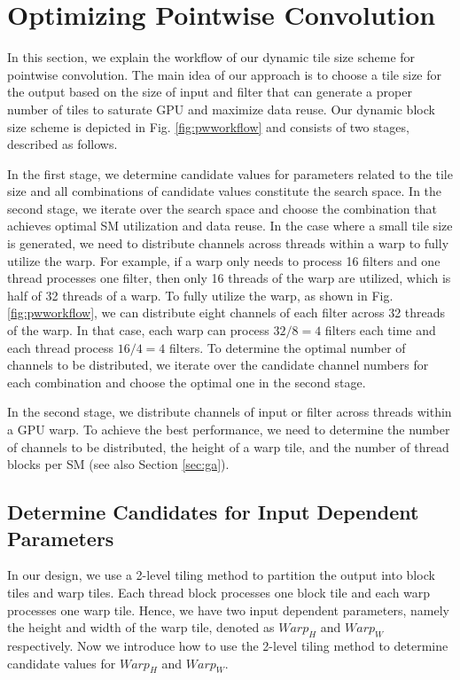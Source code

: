 \section{Optimizing Pointwise Convolution}
\label{sec:pwconv} In this section, we explain the workflow of our dynamic tile size scheme for pointwise convolution.
The main idea of our approach is to choose a tile size for the output based on the size of input and filter that can generate a proper number of tiles to saturate GPU and maximize data reuse.
 Our dynamic block size scheme is
depicted in Fig. \ref{fig:pwworkflow} and consists of two stages, described as follows.

In the first stage, we determine candidate values for parameters related to the tile size and all combinations of candidate values constitute the search space. In the second stage, we iterate over the search space and choose the combination that achieves optimal SM utilization and data reuse. In the case where a small tile size is generated, we need to distribute channels across threads within a warp to fully utilize the warp. For example, if a warp only needs to process 16 filters and one thread processes one filter, then only 16 threads of the warp are utilized, which is half of 32 threads of a warp. To fully utilize the warp, as shown in Fig. \ref{fig:pwworkflow}, we can distribute eight channels of each filter across 32 threads of the warp. In that case, each warp can process $32/8=4$ filters each time and each thread process $16/4=4$ filters. To determine the optimal number of channels to be distributed, we iterate over the candidate channel numbers for each combination and choose the optimal one in the second stage.  

 In the second stage, we distribute channels of input or filter across threads
within a GPU warp. To achieve the best performance, we need to determine the number of channels to be distributed, the height of a warp
tile, and the number of thread blocks per SM (see also Section \ref{sec:ga}).

\subsection{Determine Candidates for Input Dependent Parameters}
In our design, we use a 2-level tiling method to partition the output into block tiles and warp tiles.
Each thread block processes one block tile and each warp processes one warp tile.
Hence, we have two input dependent parameters, namely the height and width of the warp tile, denoted as $Warp_H$ and $Warp_W$ respectively.
Now we introduce how to use the 2-level tiling method to determine candidate values for $Warp_H$ and $Warp_W$. 

